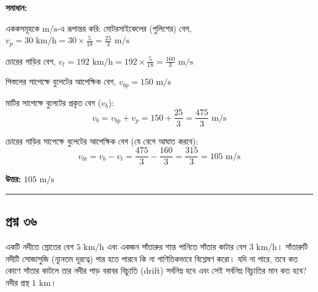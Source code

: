 \documentclass[11pt,a4paper]{article}
\begin{document}
\vspace{0.3cm}
\begin{center}
\end{center}

\textbf{সমাধান:}

এককসমূহকে $\text{m/s}$-এ রূপান্তর করি:
মোটরসাইকেলের (পুলিশের) বেগ, $v_p = 30\text{ km/h} = 30 \times \frac{5}{18} = \frac{25}{3}\text{ m/s}$

চোরের গাড়ির বেগ, $v_t = 192\text{ km/h} = 192 \times \frac{5}{18} = \frac{160}{3}\text{ m/s}$

পিস্তলের সাপেক্ষে বুলেটের আপেক্ষিক বেগ, $v_{bp} = 150\text{ m/s}$

মাটির সাপেক্ষে বুলেটের প্রকৃত বেগ ($v_b$):
$$v_b = v_{bp} + v_p = 150 + \frac{25}{3} = \frac{475}{3}\text{ m/s}$$

চোরের গাড়ির সাপেক্ষে বুলেটের আপেক্ষিক বেগ (যে বেগে আঘাত করবে):
$$v_{bt} = v_b - v_t = \frac{475}{3} - \frac{160}{3} = \frac{315}{3} = 105\text{ m/s}$$

\textbf{উত্তর:} $105\text{ m/s}$

\vspace{0.5cm}
\hrule
\vspace{0.5cm}

\subsection*{প্রশ্ন ৩৬}

একটি নদীতে স্রোতের বেগ $5\text{ km/h}$ এবং একজন সাঁতারুর শান্ত পানিতে সাঁতার কাটার বেগ $3\text{ km/h}$। সাঁতারুটি নদীটি সোজাসুজি (ন্যূনতম দূরত্বে) পার হতে পারবে কি না গাণিতিকভাবে বিশ্লেষণ করো। যদি না পারে, তবে কত কোণে সাঁতার কাটলে তার নদীর পাড় বরাবর বিচ্যুতি (drift) সর্বনিম্ন হবে এবং সেই সর্বনিম্ন বিচ্যুতির মান কত হবে? নদীর প্রস্থ $1\text{ km}$।
\end{document}
